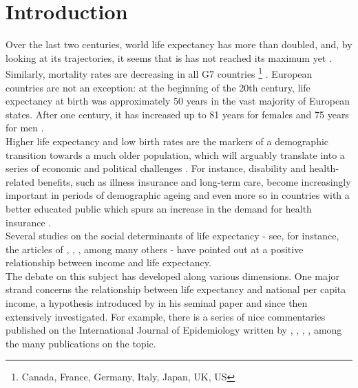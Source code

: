 




\chapter{Introduction}

Over the last two centuries, world life expectancy has more than doubled, and, by looking at its trajectories, it seems that is has not reached its maximum yet \citep{Oeppen2002}.
Similarly, mortality rates are decreasing in all G7 countries \footnote{Canada, France, Germany, Italy, Japan, UK, US} \citep{Tuljapurkar2000}.
European countries are not an exception: at the beginning of the 20th century, life expectancy at birth was approximately 50 years in the vast majority of European states. After one century, it has increased up to 81 years for females and 75 years for men \citep{beer2002}.\\

Higher life expectancy and low birth rates are the markers of a demographic transition towards a much older population, which will arguably translate into a series of economic and political challenges \citep{Lee2003}.
For instance, disability and health-related benefits, such as illness insurance and long-term care, become increasingly important in periods of demographic ageing and even more so in countries with a better educated public which spurs an increase in the demand for health insurance \citep{haberman1999}.\\

Several studies on the social determinants of life expectancy - see, for instance, the articles of \cite{Chetty2016}, \cite{Mackenbach2013}, \cite{Duggan2008a}, among many others -  have pointed out at a positive relationship between income and life expectancy. \\
\indent The debate on this subject has developed along various dimensions. 
One major strand concerns the relationship between life expectancy and national per capita income, a hypothesis introduced by \cite{Preston1975a} in his seminal paper and since then extensively investigated. For example, there is a series of nice commentaries published on the International Journal of Epidemiology written by \cite{Bloom2007}, \cite{Leon2007}, \cite{Wilkinson2007}, \cite{Mackenbach2013a}, among the many publications on the topic.\\


